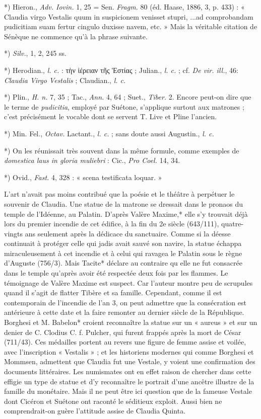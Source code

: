 \documentclass[a4paper, 11pt, oneside, polutonikogreek, french]{article}
\begin{document}
*) Hieron., \emph{Adv. Iovin.} 1, 25 = Sen. \emph{Fragm.} 80 (éd. Haase, 1886, 3, p. 433) : « Claudia virgo Vestalis quum in suspicionem venisset stupri, ...ad comprobandam pudicitiam suam fertur cingulo duxisse navem, etc. » Mais la véritable citation de Sénèque ne commence qu'à la phrase suivante.

*) \emph{Silv.}, 1, 2, 245 ss.

*) Herodian., \emph{l. c.} : τὴν ἱέρειαν τῆς Ἑστίας ; Julian., \emph{l. c.} ; cf. \emph{De vir. ill.}, 46: \emph{Claudia Virgo Vestalis} ; Claudian., \emph{l. c.}

*) Plin., \emph{H. n.} 7, 35 ; Tac., \emph{Ann.} 4, 64 ; Suet., \emph{Tiber.} 2. Encore peut-on dire que le terme de \emph{pudicitia}, employé par Suétone, s'applique surtout aux matrones ; c'est précisément le vocable dont se servent T. Live et Pline l'ancien.

*) Min. Fel., \emph{Octav.} Lactant., \emph{l. c.} ; sans doute aussi Augustin., \emph{l. c.}

*) On les réunissait très souvent dans la même formule, comme exemples de \emph{domestica laus in gloria muliebri} : Cic., \emph{Pro Coel.} 14, 34.

*) Ovid., \emph{Fast.} 4, 328 : « scena testificata loquar. »

L'art n'avait pas moins contribué que la poésie et le théâtre à perpétuer le souvenir de Claudia. Une statue de la matrone se dressait dans le pronaos du temple de l'Idéenne, au Palatin. D'après Valère Maxime,* elle s'y trouvait déjà lors du premier incendie de cet édifice, à la fin du 2e siècle (643/111), quatre-vingts ans seulement après la dédicace du sanctuaire. Comme si la déesse continuait à protéger celle qui jadis avait sauvé son navire, la statue échappa miraculeusement à cet incendie et à celui qui ravagea le Palatin sous le règne d'Auguste (756/3). Mais Tacite* déclare au contraire qu elle ne fut consacrée dans le temple qu'après avoir été respectée deux fois par les flammes. Le témoignage de Valère Maxime est suspect. Car l'auteur montre peu de scrupules quand il s'agit de flatter Tibère et sa famille. Cependant, comme il est contemporain de l'incendie de l'an 3, on peut admettre que la consécration est antérieure à cette date et la faire remonter au dernier siècle de la République. Borghesi et M. Babelon* croient reconnaître la statue sur un « aureus » et sur un denier de C. Clodius C. f. Pulcher, qui furent frappés après la mort de César (711/43). Ces médailles portent au revers une figure de femme assise et voilée, avec l'inscription « Vestalis » ; et les historiens modernes qui comme Borghesi et Mommsen, admettent que Claudia fut une Vestale, y voient une confirmation des documents littéraires. Les numismates ont en effet raison de chercher dans cette effigie un type de statue et d'y reconnaître le portrait d'une ancêtre illustre de la famille du monétaire. Mais il ne peut être ici question que de la fameuse Vestale dont Cicéron et Suétone ont raconté le séditieux exploit. Aussi bien ne comprendrait-on guère l'attitude assise de Claudia Quinta.
\end{document}
